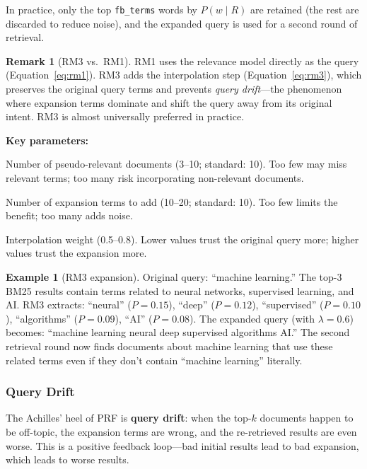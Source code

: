 \documentclass[11pt,a4paper]{article}
\theoremstyle{definition}
\newtheorem{example}{Example}[section]
\newtheorem{remark}{Remark}[section]
\theoremstyle{plain}
\begin{document}
In practice, only the top \texttt{fb\_terms} words by $P(w \mid R)$ are retained (the rest are discarded to reduce noise), and the expanded query is used for a second round of retrieval.

\begin{remark}[RM3 vs.\ RM1]
RM1 uses the relevance model directly as the query (Equation~\ref{eq:rm1}). RM3 adds the interpolation step (Equation~\ref{eq:rm3}), which preserves the original query terms and prevents \emph{query drift}---the phenomenon where expansion terms dominate and shift the query away from its original intent. RM3 is almost universally preferred in practice.
\end{remark}

\textbf{Key parameters:}
\begin{description}[leftmargin=2cm]
    \item[\texttt{fb\_docs}] Number of pseudo-relevant documents (3--10; standard: 10). Too few may miss relevant terms; too many risk incorporating non-relevant documents.
    \item[\texttt{fb\_terms}] Number of expansion terms to add (10--20; standard: 10). Too few limits the benefit; too many adds noise.
    \item[$\lambda$] Interpolation weight (0.5--0.8). Lower values trust the original query more; higher values trust the expansion more.
\end{description}

\begin{example}[RM3 expansion]
Original query: ``machine learning.'' The top-3 BM25 results contain terms related to neural networks, supervised learning, and AI. RM3 extracts: ``neural'' ($P=0.15$), ``deep'' ($P=0.12$), ``supervised'' ($P=0.10$), ``algorithms'' ($P=0.09$), ``AI'' ($P=0.08$). The expanded query (with $\lambda = 0.6$) becomes: ``machine learning neural deep supervised algorithms AI.'' The second retrieval round now finds documents about machine learning that use these related terms even if they don't contain ``machine learning'' literally.
\end{example}

\subsubsection{Query Drift}

The Achilles' heel of PRF is \textbf{query drift}: when the top-$k$ documents happen to be off-topic, the expansion terms are wrong, and the re-retrieved results are even worse. This is a positive feedback loop---bad initial results lead to bad expansion, which leads to worse results.
\end{document}
